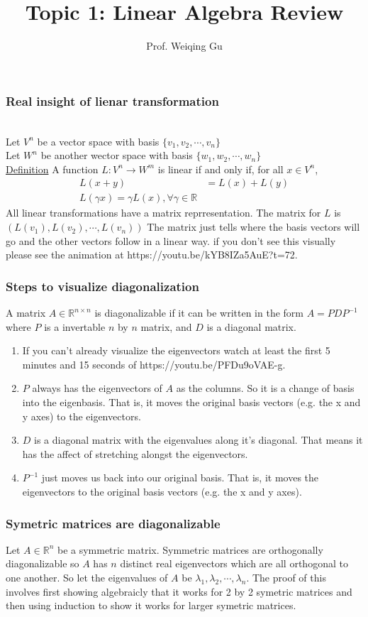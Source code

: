 \documentclass{beamer}
\title{Topic 1: Linear Algebra Review}
\author{Prof. Weiqing Gu}
\date{}
\institute{Math 142:\\Differential Geometry}
\theoremstyle{definition}
\renewcommand{\=}{&=&}
\newcommand{\<}{\langle}
\renewcommand{\>}{\rangle}
\begin{document}
\begin{frame}[t]
\frametitle{Real insight of lienar transformation}  \\
Let $V^n$ be a vector space with basis $\{ v_1, v_2, \cdots, v_n \}$ \\
Let $W^n$ be another wector space with basis $\{ w_1, w_2, \cdots, w_n \}$ \\

\underline{Definition} A function $L: V^n \rightarrow W^m$ is linear if and only if,
for all $x \in V^n$,
\begin{align*}
  L(x + y) &= L(x) + L(y) \\
  L(\gamma x) = \gamma L(x), \forall \gamma \in \mathbb{R}
\end{align*}
All linear transformations have a matrix reprresentation.
The matrix for $L$ is $(L(v_1), L(v_2), \cdots, L(v_n))$
The matrix just tells where the basis vectors will go and the other vectors
follow in a linear way. if you don't see this visually please see the animation
at https://youtu.be/kYB8IZa5AuE?t=72. 
\end{frame}
\begin{frame}[t]
  \frametitle{Steps to visualize diagonalization}
  A matrix $A \in \mathbb{R}^{n\times n}$ is diagonalizable if it can be written in the form $A = PDP^{-1}$
  where $P$ is a invertable $n$ by $n$ matrix, and $D$ is a diagonal matrix.
  \begin{enumerate}
  \item If you can't already visualize the eigenvectors watch at least the first
    5 minutes and 15 seconds of https://youtu.be/PFDu9oVAE-g.
  \item $P$ always has the eigenvectors of $A$ as the columns. So it is a change of basis into the eigenbasis. That is, it moves the
    original basis vectors (e.g. the x and y axes) to the eigenvectors.
  \item $D$ is a diagonal matrix with the eigenvalues along it's diagonal. That
    means it has the affect of stretching alongst the eigenvectors.
  \item $P^{-1}$ just moves us back into our original basis. That is, it moves
    the eigenvectors to the original basis vectors (e.g. the x and y axes).
  \end{enumerate}
\end{frame}
\begin{frame}[t]
\frametitle{Symetric matrices are diagonalizable}
Let $A \in \mathbb{R}^n$ be a symmetric matrix.
Symmetric matrices are orthogonally diagonalizable so $A$ has $n$ distinct real
eigenvectors which are all orthogonal to one another.
So let the eigenvalues of $A$ be $\lambda_1, \lambda_2, \cdots, \lambda_n$. The proof of this involves
first showing algebraicly that it works for 2 by 2 symetric matrices and then using
induction to show it works for larger symetric matrices. \\
\end{frame}
\end{document}
